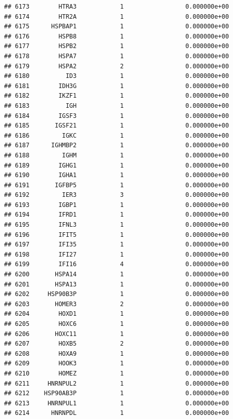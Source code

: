 \documentclass[
]{article}
\begin{document}
\begin{verbatim}
## 6173        HTRA3            1                 0.000000e+00
## 6174        HTR2A            1                 0.000000e+00
## 6175      HSPBAP1            1                 0.000000e+00
## 6176        HSPB8            1                 0.000000e+00
## 6177        HSPB2            1                 0.000000e+00
## 6178        HSPA7            1                 0.000000e+00
## 6179        HSPA2            2                 0.000000e+00
## 6180          ID3            1                 0.000000e+00
## 6181        IDH3G            1                 0.000000e+00
## 6182        IKZF1            1                 0.000000e+00
## 6183          IGH            1                 0.000000e+00
## 6184        IGSF3            1                 0.000000e+00
## 6185       IGSF21            1                 0.000000e+00
## 6186         IGKC            1                 0.000000e+00
## 6187      IGHMBP2            1                 0.000000e+00
## 6188         IGHM            1                 0.000000e+00
## 6189        IGHG1            1                 0.000000e+00
## 6190        IGHA1            1                 0.000000e+00
## 6191       IGFBP5            1                 0.000000e+00
## 6192         IER3            3                 0.000000e+00
## 6193        IGBP1            1                 0.000000e+00
## 6194        IFRD1            1                 0.000000e+00
## 6195        IFNL3            1                 0.000000e+00
## 6196        IFIT5            1                 0.000000e+00
## 6197        IFI35            1                 0.000000e+00
## 6198        IFI27            1                 0.000000e+00
## 6199        IFI16            4                 0.000000e+00
## 6200       HSPA14            1                 0.000000e+00
## 6201       HSPA13            1                 0.000000e+00
## 6202     HSP90B3P            1                 0.000000e+00
## 6203       HOMER3            2                 0.000000e+00
## 6204        HOXD1            1                 0.000000e+00
## 6205        HOXC6            1                 0.000000e+00
## 6206       HOXC11            1                 0.000000e+00
## 6207        HOXB5            2                 0.000000e+00
## 6208        HOXA9            1                 0.000000e+00
## 6209        HOOK3            1                 0.000000e+00
## 6210        HOMEZ            1                 0.000000e+00
## 6211     HNRNPUL2            1                 0.000000e+00
## 6212    HSP90AB3P            1                 0.000000e+00
## 6213     HNRNPUL1            1                 0.000000e+00
## 6214      HNRNPDL            1                 0.000000e+00

\end{verbatim}
\end{document}
